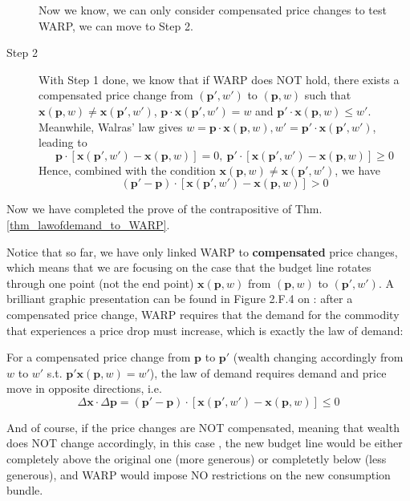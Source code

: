 \begin{description}
    Now we know, we can only consider compensated price changes to test WARP, we can move to Step 2.
    \item[Step 2] With Step 1 done, we know that if WARP does NOT hold, there exists a compensated price change from $(\mathbf{p}',w')$ to $(\mathbf{p},w)$ such that $\mathbf{x}(\mathbf{p},w)\neq \mathbf{x}(\mathbf{p}',w')$, $\mathbf{p}\cdot \mathbf{x}(\mathbf{p}',w')=w$ and $\mathbf{p'}\cdot \mathbf{x}(\mathbf{p},w)\leq w'$. 
    Meanwhile, Walras' law gives $w= \mathbf{p}\cdot\mathbf{x}(\mathbf{p},w),w'=\mathbf{p}'\cdot\mathbf{x}(\mathbf{p}',w')$, leading to 
    $$\mathbf{p}\cdot\left[\mathbf{x}(\mathbf{p}',w')-\mathbf{x}(\mathbf{p},w)\right]=0,\ \mathbf{p}'\cdot\left[\mathbf{x}(\mathbf{p}',w')-\mathbf{x}(\mathbf{p},w)\right]\geq 0$$
    Hence, combined with the condition $\mathbf{x}(\mathbf{p},w)\neq \mathbf{x}(\mathbf{p}',w')$, we have
    $$(\mathbf{p}'-\mathbf{p})\cdot\left[\mathbf{x}(\mathbf{p}',w')-\mathbf{x}(\mathbf{p},w)\right]> 0$$ 
\end{description}
Now we have completed the prove of the contrapositive of Thm.\ref{thm_lawofdemand_to_WARP}.

Notice that so far, we have only linked WARP to \textbf{compensated} price changes, which means that we are focusing on the case that the budget line rotates through one point (not the end point) $\mathbf{x}(\mathbf{p},w)$ from $(\mathbf{p},w)$ to $(\mathbf{p}',w')$. A brilliant graphic presentation can be found in Figure 2.F.4 on \citet[Page 33]{mas1995microeconomic}: after a compensated price change, WARP requires that the demand for the commodity that experiences a price drop must increase, which is exactly the law of demand:
\begin{theorem}\label{thm_compensated_lawofdemand}
    For a compensated price change from $\mathbf{p}$ to $\mathbf{p}'$ (wealth changing accordingly from $w$ to $w'$ s.t. $\mathbf{p}'\mathbf{x}(\mathbf{p},w)=w'$), the law of demand requires demand and price move in opposite directions, i.e.
    $$\Delta \mathbf{x}\cdot \Delta \mathbf{p} = (\mathbf{p}'-\mathbf{p})\cdot [\mathbf{x}(\mathbf{p}',w')-\mathbf{x}(\mathbf{p},w)]\leq 0$$
\end{theorem}

And of course, if the price changes are NOT compensated, meaning that wealth does NOT change accordingly, in this case \citep[Figure 2.F.5, Page 33]{mas1995microeconomic}, the new budget line would be either completely above the original one (more generous) or completetly below (less generous), and WARP would impose NO restrictions on the new consumption bundle.

